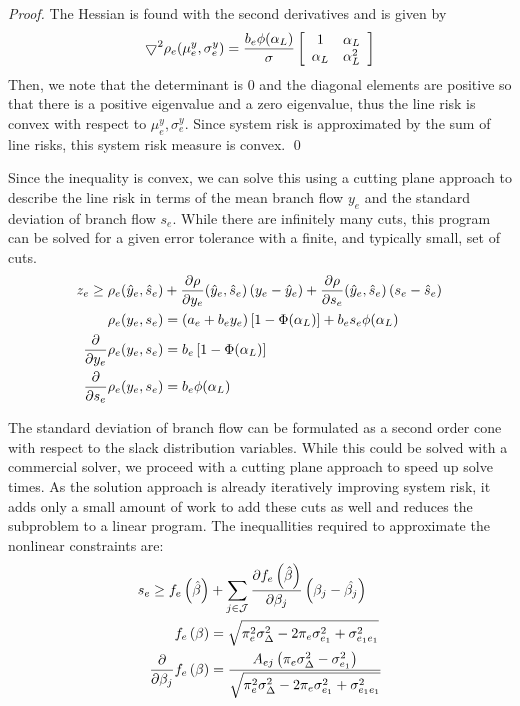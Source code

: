 \begin{proof}
The Hessian is found with the second derivatives and is given by
\begin{equation}
\bigtriangledown^2 \rho_e(\mu^y_e,\sigma^y_e) = \frac{b_e \phi(\alpha_L)}{\sigma}
\left[ 
\begin{array}{c c}
1 & \alpha_L \\
\alpha_L & \alpha_L^2
\end{array}
\right]
\end{equation}
Then, we note that the determinant is 0 and the diagonal elements are positive so that there is a positive eigenvalue and a zero eigenvalue, thus the line risk is convex with respect to $\mu^y_e, \sigma^y_e$.  Since system risk is approximated by the sum of line risks, this system risk measure is convex. \qed
\end{proof}

 Since the inequality  is convex, we can solve this using a cutting plane approach to describe the line risk in terms of the mean branch flow $y_e$ and the standard deviation of branch flow $s_e$.  While there are infinitely many cuts, this program can be solved for a given error tolerance with a finite, and typically small, set of cuts.
\begin{subequations}
\label{line_risk_cuts}
\begin{align}
z_e \geq \rho_e(\hat{y}_e,\hat{s}_e) &+ \frac{\partial \rho}{\partial y_e}(\hat{y}_e,\hat{s}_e) \left(y_e - \hat{y}_e \right) 
+ \frac{\partial \rho}{\partial s_e}(\hat{y}_e,\hat{s}_e) \left(s_e - \hat{s}_e \right) \\
\rho_e(y_e,s_e) &= (a_e + b_e y_e)\left[ 1 - \Phi(\alpha_L) \right]  + b_e s_e \phi(\alpha_L)  \\
 \frac{\partial}{\partial y_e}\rho_e(y_e,s_e) &= b_e\left[ 1 - \Phi(\alpha_L) \right]\\
\frac{\partial}{\partial s_e}\rho_e(y_e,s_e) &= b_e \phi(\alpha_L) 
\end{align}
\end{subequations}

The standard deviation of branch flow can be formulated as a second order cone with respect to the slack distribution variables.  While this could be solved with a commercial solver, we proceed with a cutting plane approach to speed up solve times.  As the solution approach is already iteratively improving system risk, it adds only a small amount of work to add these cuts as well and reduces the subproblem to a linear program.  The inequallities required to approximate the nonlinear constraints  are:
\begin{subequations}
\label{branch_var_cuts}
\begin{align}
s_e \geq f_e\left(\hat{\beta}\right) &+ \sum_{j \in \mathcal{J}} \frac{\partial f_e\left(\hat{\beta} \right)}{\partial \beta_j} \left( \beta_j - \hat{\beta_j} \right)\\
  f_e\left(\beta\right) &= \sqrt{\pi_e^2 \sigma_\Delta^2 - 2 \pi_e \sigma_{e_1}^2  + \sigma_{e_1 e_1}^2 }\\
  \frac{\partial}{\partial \beta_j}f_e\left(\beta\right) &= \frac{A_{ej} \left( \pi_e \sigma_\Delta^2 - \sigma_{e_1}^2 \right)}{\sqrt{\pi_e^2 \sigma_\Delta^2 - 2 \pi_e \sigma_{e_1}^2  + \sigma_{e_1 e_1}^2 }}
\end{align}
\end{subequations}




